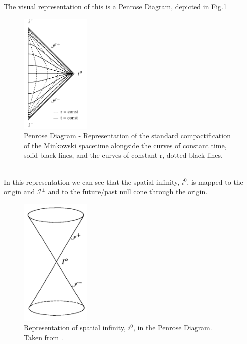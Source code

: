 The visual representation of this is a Penrose Diagram, depicted in Fig.1
\begin{figure}[h]
	\centering \includegraphics[width =0.3\textwidth]{Penrose diagram.pdf}
    \caption{Penrose Diagram - Representation of the standard
      compactification of the Minkowski spacetime alongside the curves of constant
      time, solid black lines, and the curves of constant r, dotted
      black lines.}
\end{figure}
\\
In this representation we can see that the spatial infinity, $i^0$, is mapped to the origin and $\mathscr{I}^{\pm}$ and to the future/past null cone through the origin.\\

\begin{figure}[h]
	\centering \includegraphics[width =0.3\textwidth]{spatial infinity.jpeg}
    \caption{Representation of spatial infinity, $i^0$, in the Penrose Diagram.\\ Taken from \cite{Ste91}.}
\end{figure}
